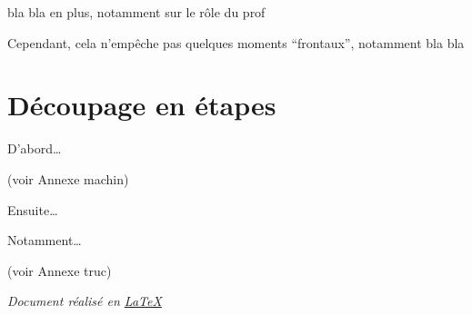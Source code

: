 \documentclass[11pt,bibliography=totoc]{scrartcl}
\begin{document}
bla bla en plus, notamment sur le rôle du prof

Cependant, cela n'empêche pas quelques moments ``frontaux'', notamment bla bla 

\section{Découpage en étapes}
D'abord\ldots

(voir Annexe machin)

Ensuite\ldots

Notamment\ldots

(voir Annexe truc)




\vfill
\emph{Document réalisé en \href{https://www.latex-project.org/}{\LaTeX}}
\end{document}
